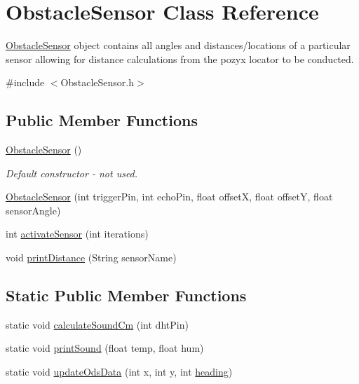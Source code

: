 \hypertarget{class_obstacle_sensor}{}\section{Obstacle\+Sensor Class Reference}
\label{class_obstacle_sensor}


\mbox{\hyperlink{class_obstacle_sensor}{Obstacle\+Sensor}} object contains all angles and distances/locations of a particular sensor allowing for distance calculations from the pozyx locator to be conducted.  




{\ttfamily \#include $<$Obstacle\+Sensor.\+h$>$}

\subsection*{Public Member Functions}
\begin{DoxyCompactItemize}
\item 
\mbox{\hyperlink{class_obstacle_sensor_ad1268ce55070472bf5ca463a919d1dd5}{Obstacle\+Sensor}} ()
\begin{DoxyCompactList}\small\item\em Default constructor -\/ not used. \end{DoxyCompactList}\item 
\mbox{\hyperlink{class_obstacle_sensor_a286a6027b6e9097ead4d2d1da7881c4e}{Obstacle\+Sensor}} (int trigger\+Pin, int echo\+Pin, float offsetX, float offsetY, float sensor\+Angle)
\item 
int \mbox{\hyperlink{class_obstacle_sensor_ab0fa6b563d7bd3604256682311ee029d}{activate\+Sensor}} (int iterations)
\item 
void \mbox{\hyperlink{class_obstacle_sensor_ad7b512504389e1925d3777f7395ef3ae}{print\+Distance}} (String sensor\+Name)
\end{DoxyCompactItemize}
\subsection*{Static Public Member Functions}
\begin{DoxyCompactItemize}
\item 
static void \mbox{\hyperlink{class_obstacle_sensor_acd7255d7273231178876c5144b2269eb}{calculate\+Sound\+Cm}} (int dht\+Pin)
\item 
static void \mbox{\hyperlink{class_obstacle_sensor_a66ce921e669bb83fa8f23ad2bc2733ee}{print\+Sound}} (float temp, float hum)
\item 
static void \mbox{\hyperlink{class_obstacle_sensor_a7d7da634cf955d1890c5340336f88e28}{update\+Ods\+Data}} (int x, int y, int \mbox{\hyperlink{bot_main_8ino_aa0a9c2882aad6535e52a6d429f1d42da}{heading}})
\end{DoxyCompactItemize}
